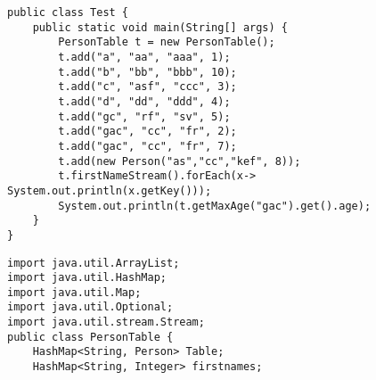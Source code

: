\documentclass[a4paper, 14pt]{extarticle}
\begin{document}
\begin{figure}[!htb]
\begin{lstlisting}[language={},caption={класс Test},label={lst:code1}]
public class Test {
    public static void main(String[] args) {
        PersonTable t = new PersonTable();
        t.add("a", "aa", "aaa", 1);
        t.add("b", "bb", "bbb", 10);
        t.add("c", "asf", "ccc", 3);
        t.add("d", "dd", "ddd", 4);
        t.add("gc", "rf", "sv", 5);
        t.add("gac", "cc", "fr", 2);
        t.add("gac", "cc", "fr", 7);
        t.add(new Person("as","cc","kef", 8));
        t.firstNameStream().forEach(x-> System.out.println(x.getKey()));
        System.out.println(t.getMaxAge("gac").get().age);
    }
}
\end{lstlisting}
\end{figure}

\begin{figure}[!htb]
\begin{lstlisting}[language={},caption={класс PersonTable},label={lst:code2}]
import java.util.ArrayList;
import java.util.HashMap;
import java.util.Map;
import java.util.Optional;
import java.util.stream.Stream;
public class PersonTable {
    HashMap<String, Person> Table;
    HashMap<String, Integer> firstnames;
\end{lstlisting}
\end{figure}
\end{document}
